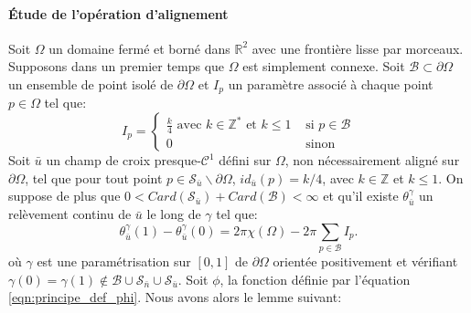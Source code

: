 \paragraph{\'Etude de l'opération d'alignement}

Soit $\Omega$ un domaine fermé et borné dans $\mathbb{R}^2$ avec une frontière lisse par morceaux. Supposons dans un premier temps que $\Omega$ est simplement connexe. Soit $\mathcal{B}\subset\partial\Omega$ un ensemble de point isolé de $\partial\Omega$ et $I_p$ un paramètre associé à chaque point $p\in\Omega$ tel que:
\begin{equation}
I_p=
\left\{
\begin{array}{ll}
\displaystyle\frac{k}{4}\mbox{ avec }k\in\mathbb{Z}^*\mbox{ et }k\leq 1& \mbox{ si } p\in\mathcal{B}\\[0.5cm]
0& \mbox{ sinon }
\end{array}
\right.
\label{eqn:etude_def_I}
\end{equation}
Soit $\bar{u}$ un champ de croix presque-$\mathcal{C}^1$ défini sur $\Omega$, non nécessairement aligné sur $\partial\Omega$, tel que pour tout point $p\in\mathcal{S}_{\bar{u}}\backslash\partial\Omega$, $id_{\bar{u}}(p)=k/4$, avec $k\in\mathbb{Z}$ et $k\leq 1$. On suppose de plus que $0< Card(\mathcal{S}_{\bar{u}})+Card(\mathcal{B})< \infty$ et qu'il existe $\theta_{\bar{u}}^\gamma$ un relèvement continu de $\bar{u}$ le long de $\gamma$ tel que:
\begin{equation}
    \label{eqn:etude_hypothese_u}
    \theta_{\bar{u}}^\gamma(1)-\theta_{\bar{u}}^\gamma(0)=2\pi\chi(\Omega)-2\pi\sum_{p\in\mathcal{B}}I_p.
\end{equation}
où $\gamma$ est une paramétrisation sur $[0, 1]$ de $\partial\Omega$ orientée positivement et vérifiant $\gamma(0)=\gamma(1)\notin\mathcal{B}\cup\mathcal{S}_{\bar{n}}\cup\mathcal{S}_{\bar{u}}$.
Soit $\phi$, la fonction définie par l'équation \eqref{eqn:principe_def_phi}. Nous avons alors le lemme suivant:

